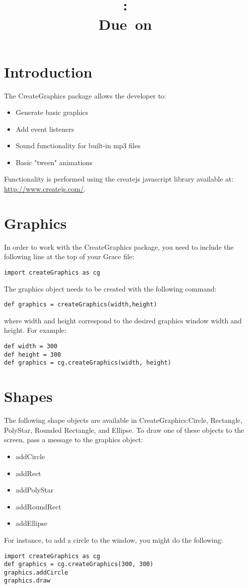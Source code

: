 \documentclass{article}
\title{
    \vspace{2in}
    \textmd{\textbf{\hmwkClass:\ \hmwkTitle}}\\
    \normalsize\vspace{0.1in}\small{Due\ on\ \hmwkDueDate}\\
    \vspace{0.1in}\large{\textit{\hmwkClassInstructor}}
    \vspace{3in}
}
\author{\textbf{\hmwkAuthorName}}
\begin{document}
\section{Introduction}
The CreateGraphics package allows the developer to:

\begin{itemize}
\item Generate basic graphics
\item Add event listeners
\item Sound functionality for built-in mp3 files
\item Basic "tween" animations
\end{itemize}

Functionality is performed using the createjs javascript library available at:\\
\url{http://www.createjs.com/}. 

\section{Graphics}
In order to work with the CreateGraphics package, you need to include the 
following line at the top of your Grace file:

\texttt{import createGraphics as cg}

The graphics object needs to be created with the following command:

\texttt{def graphics = createGraphics(width,height)} 

where width and height correspond to the desired graphics window width
and height. For example:

\begin{lstlisting}
def width = 300
def height = 300
def graphics = cg.createGraphics(width, height)
\end{lstlisting}

\section{Shapes}
The following shape objects are available in CreateGraphics:Circle, Rectangle, PolyStar, Rounded Rectangle, and Ellipse.
To draw one of these objects to the screen, pass a message to the graphics object:

\begin{itemize}
\item addCircle
\item addRect
\item addPolyStar
\item addRoundRect
\item addEllipse
\end{itemize}

For instance, to add a circle to the window, you might do the following:
\begin{lstlisting}
import createGraphics as cg
def graphics = cg.createGraphics(300, 300)
graphics.addCircle
graphics.draw
\end{lstlisting}
\end{document}
